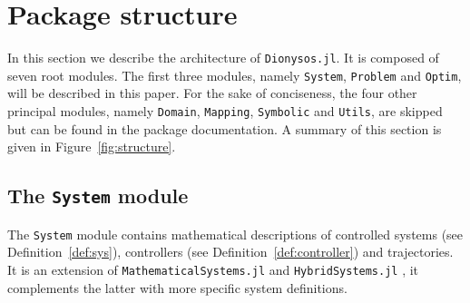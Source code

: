 \documentclass{juliacon}
\begin{document}
\section{Package structure}
\label{sec:package}

In this section we describe the architecture of \texttt{Dionysos.jl}. It is composed of seven root modules. The first three modules, namely \texttt{System}, \texttt{Problem} and \texttt{Optim}, will be described in this paper. For the sake of conciseness, the four other principal modules, namely \texttt{Domain}, \texttt{Mapping}, \texttt{Symbolic} and \texttt{Utils}, are skipped but can be found in the package documentation. A summary of this section is given in Figure~\ref{fig:structure}.

\subsection{The \texttt{System} module}

The \texttt{System} module contains mathematical descriptions of controlled systems (see Definition~\ref{def:sys}), controllers (see Definition~\ref{def:controller}) and trajectories. It is an extension of \texttt{MathematicalSystems.jl} and \texttt{HybridSystems.jl} \cite{BenoitLegat2024}, it complements the latter with more specific system definitions.

\vskip 6pt
\end{document}
